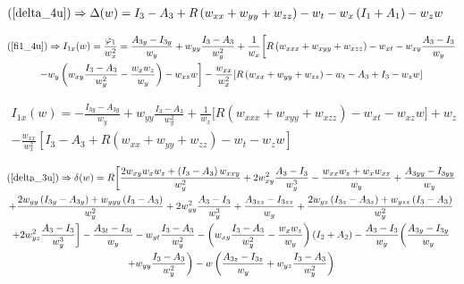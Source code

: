 \documentclass[12pt,a4paper]{article}
\begin{document}
	\begin{align}
	  (\ref{delta_4u}) \Rightarrow \Delta(w) &= I_3 - A_3 + R \left(w_{xx} + w_{yy} + w_{zz} \right) - w_t - w_x \left( I_1 + A_1 \right) - w_z w
	\end{align}

	\begin{multline}
	  (\ref{fi1_4u}) \Rightarrow I_{1x}(w) = \frac{\varphi_1}{w_x^2} = \frac{A_{3y} - I_{3y}}{w_y} + w_{yy} \frac{I_3 - A_3}{w_y^2} + \frac{1}{w_x} \biggl[ R \left(w_{xxx} + w_{xyy} + w_{xzz} \right) - w_{xt} - w_{xy} \frac{A_3 - I_3}{w_y} \\
	  - w_y \left( w_{xy} \frac{I_3 - A_3}{w_y^2} - \frac{w_x w_z}{w_y} \right) - w_{xz} w \biggr] - \frac{w_{xx}}{w_x^2} [ R \left(w_{xx} + w_{yy} + w_{zz} \right) - w_t - A_3 + I_3 - w_z w ]
	\end{multline}

	\begin{multline}
	  I_{1x}(w) = - \frac{I_{3y} - A_{3y}}{w_y} + w_{yy} \frac{I_3 - A_3}{w_y^2} + \frac{1}{w_x} \biggl[ R \left(w_{xxx} + w_{xyy} + w_{xzz} \right) - w_{xt} - w_{xz} w \biggr] + w_z \\
	  - \frac{w_{xx}}{w_x^2} [ I_3 - A_3 + R \left(w_{xx} + w_{yy} + w_{zz} \right) - w_t - w_z w ]
	\end{multline}


	\begin{multline}
	  (\ref{delta_3u}) \Rightarrow \delta(w) = R \biggl[ \frac{2 w_{xy} w_x w_z + \left( I_3 - A_3 \right) w_{xxy}}{w_y^2} + 2 w_{xy}^2 \frac{A_3 - I_3}{w_y^3} - \frac{w_{xx} w_z + w_x w_{xz}}{w_y} + \frac{A_{3yy} - I_{3yy}}{w_y} \\
	  + \frac{2 w_{yy} \left( I_{3y} - A_{3y} \right) + w_{yyy} \left( I_3 - A_3 \right)}{w_y^2} + 2 w_{yy}^2 \frac{A_3 - I_3}{w_y^3} + \frac{A_{3zz} - I_{3zz}}{w_y} + \frac{2 w_{yz} \left( I_{3z} - A_{3z} \right) + w_{yzz} \left( I_3 - A_3 \right)}{w_y^2} \\
	  + 2 w_{yz}^2 \frac{A_3 - I_3}{w_y^3} \biggr] - \frac{A_{3t} - I_{3t}}{w_y} - w_{yt} \frac{I_3 - A_3}{w_y^2} - \left( w_{xy} \frac{I_3 - A_3}{w_y^2} - \frac{w_x w_z}{w_y} \right) \left( I_2 + A_2 \right) - \frac{A_3 - I_3}{w_y} \biggl( \frac{A_{3y} - I_{3y}}{w_y} \\
	  + w_{yy} \frac{I_3 - A_3}{w_y^2} \biggr) - w \left( \frac{A_{3z} - I_{3z}}{w_y} + w_{yz} \frac{I_3 - A_3}{w_y^2}\right)
	\end{multline}
\end{document}
